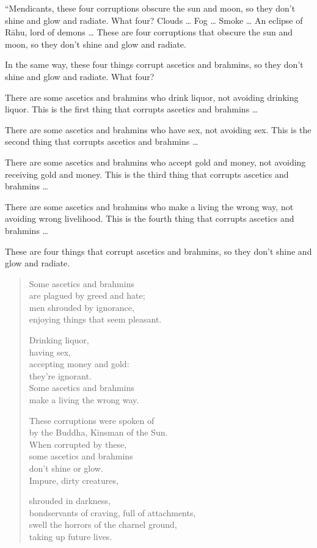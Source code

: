 \documentclass[12pt,openany]{book}%
\begin{document}
“Mendicants, these four corruptions obscure the sun and moon, so they don’t shine and glow and radiate. What four? Clouds … Fog … Smoke … An eclipse of \textsanskrit{Rāhu}, lord of demons … These are four corruptions that obscure the sun and moon, so they don’t shine and glow and radiate. 

In the same way, these four things corrupt ascetics and brahmins, so they don’t shine and glow and radiate. What four? 

There are some ascetics and brahmins who drink liquor, not avoiding drinking liquor. This is the first thing that corrupts ascetics and brahmins … 

There are some ascetics and brahmins who have sex, not avoiding sex. This is the second thing that corrupts ascetics and brahmins … 

There are some ascetics and brahmins who accept gold and money, not avoiding receiving gold and money. This is the third thing that corrupts ascetics and brahmins … 

There are some ascetics and brahmins who make a living the wrong way, not avoiding wrong livelihood. This is the fourth thing that corrupts ascetics and brahmins … 

These are four things that corrupt ascetics and brahmins, so they don’t shine and glow and radiate. 

\begin{verse}%
Some ascetics and brahmins \\
are plagued by greed and hate; \\
men shrouded by ignorance, \\
enjoying things that seem pleasant. 

Drinking liquor, \\
having sex, \\
accepting money and gold: \\
they’re ignorant. \\
Some ascetics and brahmins \\
make a living the wrong way. 

These corruptions were spoken of \\
by the Buddha, Kinsman of the Sun. \\
When corrupted by these, \\
some ascetics and brahmins \\
don’t shine or glow. \\
Impure, dirty creatures, 

shrouded in darkness, \\
bondservants of craving, full of attachments, \\
swell the horrors of the charnel ground, \\
taking up future lives. 

%
\end{verse}
\end{document}

